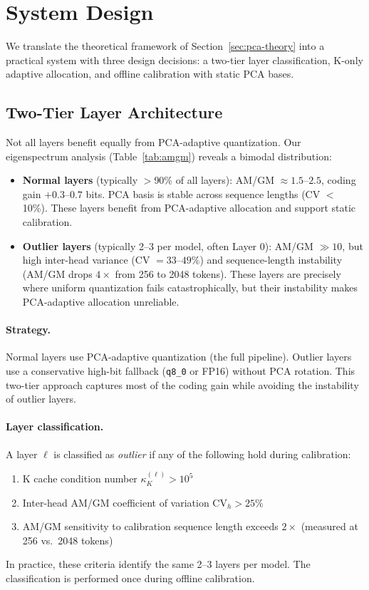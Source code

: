 \section{System Design}
\label{sec:system}

We translate the theoretical framework of Section~\ref{sec:pca-theory} into a practical system with three design decisions: a two-tier layer classification, K-only adaptive allocation, and offline calibration with static PCA bases.

\subsection{Two-Tier Layer Architecture}
\label{sec:two-tier}

Not all layers benefit equally from PCA-adaptive quantization. Our eigenspectrum analysis (Table~\ref{tab:amgm}) reveals a bimodal distribution:

\begin{itemize}
    \item \textbf{Normal layers} (typically $>$90\% of all layers): AM/GM $\approx 1.5$--$2.5$, coding gain $+0.3$--$0.7$ bits. PCA basis is stable across sequence lengths (CV $<$ 10\%). These layers benefit from PCA-adaptive allocation and support static calibration.
    \item \textbf{Outlier layers} (typically 2--3 per model, often Layer 0): AM/GM $\gg 10$, but high inter-head variance (CV $= 33$--$49\%$) and sequence-length instability (AM/GM drops $4\times$ from 256 to 2048 tokens). These layers are precisely where uniform quantization fails catastrophically, but their instability makes PCA-adaptive allocation unreliable.
\end{itemize}

\paragraph{Strategy.}
Normal layers use PCA-adaptive quantization (the full pipeline). Outlier layers use a conservative high-bit fallback (\texttt{q8\_0} or FP16) without PCA rotation. This two-tier approach captures most of the coding gain while avoiding the instability of outlier layers.

\paragraph{Layer classification.}
A layer $\ell$ is classified as \emph{outlier} if any of the following hold during calibration:
\begin{enumerate}
    \item K cache condition number $\kappa_K^{(\ell)} > 10^5$
    \item Inter-head AM/GM coefficient of variation $\text{CV}_h > 25\%$
    \item AM/GM sensitivity to calibration sequence length exceeds $2\times$ (measured at 256 vs.\ 2048 tokens)
\end{enumerate}
In practice, these criteria identify the same 2--3 layers per model. The classification is performed once during offline calibration.

